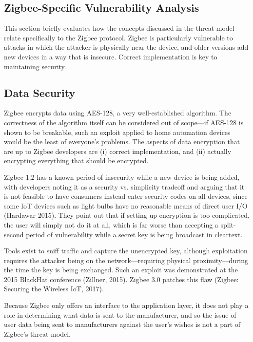 \subsection{Zigbee-Specific Vulnerability Analysis}
This section briefly evaluates how the concepts discussed in the threat model relate specifically to the Zigbee protocol. Zigbee is particularly vulnerable to attacks in which the attacker is physically near the device, and older versions add new devices in a way that is insecure. Correct implementation is key to maintaining security.

\subsection{Data Security}
Zigbee encrypts data using AES-128, a very well-established algorithm. The correctness of the algorithm itself can be considered out of scope---if AES-128 is shown to be breakable, such an exploit applied to home automation devices would be the least of everyone’s problems. The aspects of data encryption that are up to Zigbee developers are (i) correct implementation, and (ii) actually encrypting everything that should be encrypted.

Zigbee 1.2 has a known period of insecurity while a new device is being added, with developers noting it as a security vs. simplicity tradeoff and arguing that it is not feasible to have consumers instead enter security codes on all devices, since some IoT devices such as light bulbs have no reasonable means of direct user I/O (Hardawar 2015). They point out that if setting up encryption is too complicated, the user will simply not do it at all, which is far worse than accepting a split-second period of vulnerability while a secret key is being broadcast in cleartext.

Tools exist to sniff traffic and capture the unencrypted key, although exploitation requires the attacker being on the network---requiring physical proximity---during the time the key is being exchanged. Such an exploit was demonstrated at the 2015 BlackHat conference (Zillner, 2015). Zigbee 3.0 patches this flaw (Zigbee: Securing the Wireless IoT, 2017).

Because Zigbee only offers an interface to the application layer, it does not play a role in determining what data is sent to the manufacturer, and so the issue of user data being sent to manufacturers against the user’s wishes is not a part of Zigbee’s threat model.

